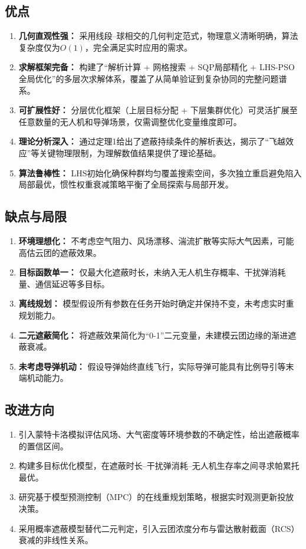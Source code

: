 \documentclass[12pt,a4paper]{ctexart}
\begin{document}
\subsection{优点}

\begin{enumerate}
    \item \textbf{几何直观性强：} 采用线段--球相交的几何判定范式，物理意义清晰明确，算法复杂度仅为$O(1)$，完全满足实时应用的需求。
    \item \textbf{求解框架完备：} 构建了“解析计算 + 网格搜索 + SQP局部精化 + LHS-PSO全局优化”的多层次求解体系，覆盖了从简单验证到复杂协同的完整问题谱系。
    \item \textbf{可扩展性好：} 分层优化框架（上层目标分配 + 下层集群优化）可灵活扩展至任意数量的无人机和导弹场景，仅需调整优化变量维度即可。
    \item \textbf{理论分析深入：} 通过定理1给出了遮蔽持续条件的解析表达，揭示了“飞越效应”等关键物理限制，为理解数值结果提供了理论基础。
    \item \textbf{算法鲁棒性：} LHS初始化确保种群均匀覆盖搜索空间，多次独立重启避免陷入局部最优，惯性权重衰减策略平衡了全局探索与局部开发。
\end{enumerate}

\subsection{缺点与局限}

\begin{enumerate}
    \item \textbf{环境理想化：} 不考虑空气阻力、风场漂移、湍流扩散等实际大气因素，可能高估云团的遮蔽效果。
    \item \textbf{目标函数单一：} 仅最大化遮蔽时长，未纳入无人机生存概率、干扰弹消耗量、通信延迟等多目标。
    \item \textbf{离线规划：} 模型假设所有参数在任务开始时确定并保持不变，未考虑实时重规划能力。
    \item \textbf{二元遮蔽简化：} 将遮蔽效果简化为“0-1”二元变量，未建模云团边缘的渐进遮蔽衰减。
    \item \textbf{未考虑导弹机动：} 假设导弹始终直线飞行，实际导弹可能具有比例导引等末端机动能力。
\end{enumerate}

\subsection{改进方向}

\begin{enumerate}
    \item 引入蒙特卡洛模拟评估风场、大气密度等环境参数的不确定性，给出遮蔽概率的置信区间。
    \item 构建多目标优化模型，在遮蔽时长--干扰弹消耗--无人机生存率之间寻求帕累托最优。
    \item 研究基于模型预测控制（MPC）的在线重规划策略，根据实时观测更新投放决策。
    \item 采用概率遮蔽模型替代二元判定，引入云团浓度分布与雷达散射截面（RCS）衰减的非线性关系。
\end{enumerate}
\end{document}
